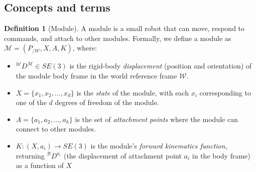 \documentclass[conference]{IEEEtran}
\theoremstyle{definition}
\newtheorem{definition}{Definition}[section]
\begin{document}
\subsection{Concepts and terms}
\begin{definition}[Module] A module is a small robot that can move, respond to commands,
and attach to other modules.  Formally, we define a  module  as $\mathcal{M}=(P_{/\mathcal{W}}, X, A,
K)$, where:
\begin{itemize}
\item ${^\mathcal{W}}D^{\mathcal{M}}\in SE(3)$ is the rigid-body \textit{displacement} (position and orientation)
of the module body frame in the world reference frame $\mathcal{W}$. 
\item \(X=\lbrace x_1, x_2, \ldots, x_d \rbrace\) is the \textit{state} of the module,
with each \(x_i\) corresponding to one of the \(d\) degrees of freedom of the module.
\item $A=\{a_1, a_2, ..., a_k\}$ is the set of \textit{attachment points} where the module can connect to other modules.
\item \(K: (X, a_i) \rightarrow SE(3) \) is the module's \textit{forward kinematics function}, returning \({^\mathcal{B}}D^{a_{i}}\) (the displacement of attachment point \(a_i\)
in the body frame) as a function of \(X\)  \end{itemize}


\end{definition}
\end{document}
